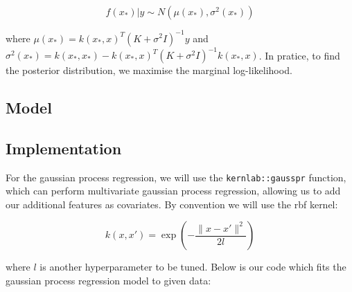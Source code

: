 \documentclass[
]{article}
\begin{document}
\[
f(x_*) | y \sim N(\mu(x_*), \sigma^2(x_*))
\]

where \(\mu(x_*) = k(x_*, x)^T(K + \sigma^2I)^{-1}y\) and
\(\sigma^2(x_*) = k(x_*, x_*) - k(x_*, x)^T(K + \sigma^2I)^{-1}k(x_*, x)\).
In pratice, to find the posterior distribution, we maximise the marginal
log-likelihood.

\hypertarget{model-2}{%
\subsection{Model}\label{model-2}}

\hypertarget{implementation-2}{%
\subsection{Implementation}\label{implementation-2}}

For the gaussian process regression, we will use the
\texttt{kernlab::gausspr} function, which can perform multivariate
gaussian process regression, allowing us to add our additional features
as covariates. By convention we will use the rbf kernel:

\[
k(x, x') = \exp\left(-\frac{\lVert x - x' \rVert^2}{2l}\right)
\]

where \(l\) is another hyperparameter to be tuned. Below is our code
which fits the gaussian process regression model to given data:
\end{document}
